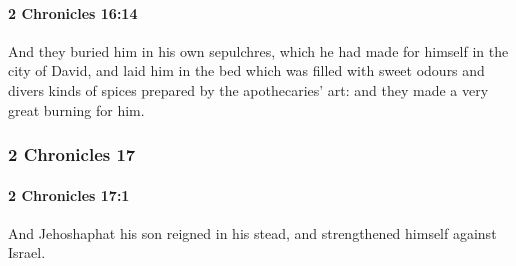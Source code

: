		\paragraph{2 Chronicles 16:14} %
			\label{2CHRONICLES-16-14}

			And they buried him in his own sepulchres, which he had made for himself in the city of David, and laid him in the bed which was filled with sweet odours and divers kinds of spices prepared by the apothecaries' art: and they made a very great burning for him.

	\subsubsection{2 Chronicles 17} %
		\label{2CHRONICLES-17}

		\paragraph{2 Chronicles 17:1} %
			\label{2CHRONICLES-17-1}

			And Jehoshaphat his son reigned in his stead, and strengthened himself against Israel.

